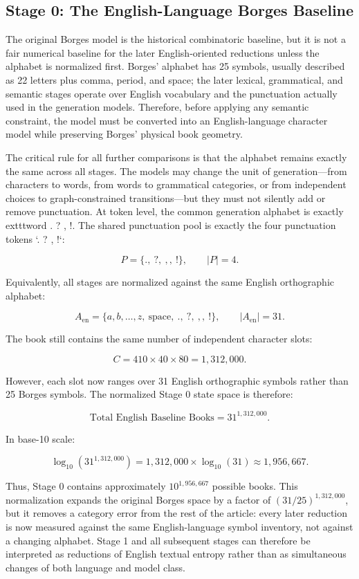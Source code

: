 \documentclass[
  11pt,
  a4paper,
]{article}
\begin{document}
\subsection{Stage 0: The English-Language Borges Baseline}\label{stage-0-the-english-language-borges-baseline}

The original Borges model is the historical combinatoric baseline, but it is not a fair numerical baseline for the later English-oriented reductions unless the alphabet is normalized first. Borges' alphabet has 25 symbols, usually described as 22 letters plus comma, period, and space; the later lexical, grammatical, and semantic stages operate over English vocabulary and the punctuation actually used in the generation models. Therefore, before applying any semantic constraint, the model must be converted into an English-language character model while preserving Borges' physical book geometry.

The critical rule for all further comparisons is that the alphabet remains exactly the same across all stages. The models may change the unit of generation---from characters to words, from words to grammatical categories, or from independent choices to graph-constrained transitions---but they must not silently add or remove punctuation. At token level, the common generation alphabet is exactly 	exttt{word . ? , !}. The shared punctuation pool is exactly the four punctuation tokens `. ? , !`:

\[
P = \{\mathtt{.},\ \mathtt{?},\ \mathtt{,},\ \mathtt{!}\}, \qquad |P| = 4.
\]

Equivalently, all stages are normalized against the same English orthographic alphabet:

\[
A_{\mathrm{en}} = \{a, b, \ldots, z,\ \text{space},\ \mathtt{.},\ \mathtt{?},\ \mathtt{,},\ \mathtt{!}\}, \qquad |A_{\mathrm{en}}| = 31.
\]

The book still contains the same number of independent character slots:

\[
C = 410 \times 40 \times 80 = 1,312,000.
\]

However, each slot now ranges over 31 English orthographic symbols rather than 25 Borges symbols. The normalized Stage 0 state space is therefore:

\[
\text{Total English Baseline Books}=31^{1,312,000}.
\]

In base-10 scale:

\[
\log_{10}(31^{1,312,000}) = 1,312,000 \times \log_{10}(31) \approx 1,956,667.
\]

Thus, Stage 0 contains approximately \(10^{1,956,667}\) possible books. This normalization expands the original Borges space by a factor of \((31/25)^{1,312,000}\), but it removes a category error from the rest of the article: every later reduction is now measured against the same English-language symbol inventory, not against a changing alphabet. Stage 1 and all subsequent stages can therefore be interpreted as reductions of English textual entropy rather than as simultaneous changes of both language and model class.
\end{document}
